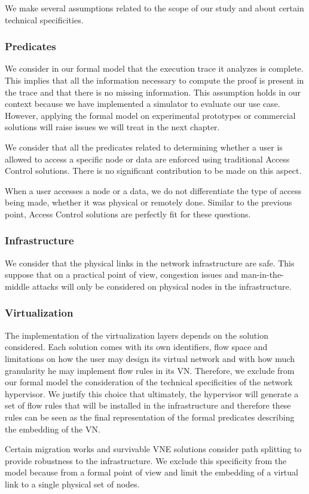 We make several assumptions related to the scope of our study and about certain technical specificities.

\subsubsection{Predicates}
We consider in our formal model that the execution trace it analyzes is complete.
This implies that all the information necessary to compute the proof is present in the trace and that there is no missing information.
This assumption holds in our context because we have implemented a simulator to evaluate our use case. However, applying the formal model on experimental prototypes or commercial solutions will raise issues we will treat in the next chapter.

We consider that all the predicates related to determining whether a user is allowed to access a specific node or data are enforced using traditional Access Control solutions.
There is no significant contribution to be made on this aspect.

When a user accesses a node or a data, we do not differentiate the type of access being made, whether it was physical or remotely done.
Similar to the previous point, Access Control solutions are perfectly fit for these questions.

\subsubsection{Infrastructure}
We consider that the physical links in the network infrastructure are safe.
This suppose that on a practical point of view, congestion issues and man-in-the-middle attacks will only be considered on physical nodes in the infrastructure.

\subsubsection{Virtualization}
The implementation of the virtualization layers depends on the solution considered.
Each solution comes with its own identifiers, flow space and limitations on how the user may design its virtual network and with how much granularity he may implement flow rules in its VN. Therefore, we exclude from our formal model the consideration of the technical specificities of the network hypervisor.
We justify this choice that ultimately, the hypervisor will generate a set of flow rules that will be installed in the infrastructure and therefore these rules can be seen as the final representation of the formal predicates describing the embedding of the VN.

Certain migration works and survivable VNE solutions consider path splitting to provide robustness to the infrastructure.
We exclude this specificity from the model because from a formal point of view and limit the embedding of a virtual link to a single physical set of nodes.

